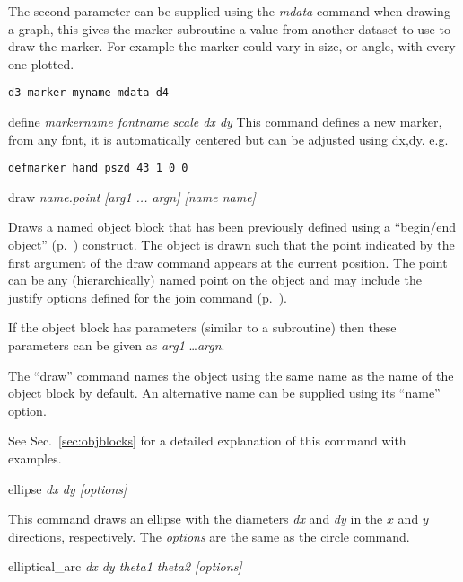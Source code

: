 \begin{commanddescription}
The second parameter can be supplied using the {\it mdata} command
when drawing a graph,  this gives the marker subroutine a
value from another dataset to use to draw the marker.  For
example the marker could vary in size, or angle, with every
one plotted.

\begin{Verbatim}
d3 marker myname mdata d4
\end{Verbatim}

\item[{\sf define {\it markername  fontname scale dx dy}}]
This command defines a new marker, from any font, it is
automatically centered but can be adjusted using dx,dy. e.g.

\begin{Verbatim}
defmarker hand pszd 43 1 0 0
\end{Verbatim}

\item[{\sf draw {\it name.point [{\it arg1} ... {\it argn}] [name {\it name}]}}]
\label{cmd:draw}

Draws a named object block that has been previously defined using a ``begin/end object'' (p.~\pageref{cmd:beginobject}) construct. The object is drawn such that the point indicated by the first argument of the draw command appears at the current position. The point can be any (hierarchically) named point on the object and may include the justify options defined for the join command (p.~\pageref{cmd:join}).

If the object block has parameters (similar to a subroutine) then these parameters can be given as {\it arg1} \ldots {\it argn}.

The ``draw'' command names the object using the same name as the name of the object block by default. An alternative name can be supplied using its ``name'' option.

See Sec.~\ref{sec:objblocks} for a detailed explanation of this command with examples.

\item[{\sf ellipse} {\it dx dy [options]}]

This command draws an ellipse with the diameters {\it dx} and {\it dy} in the $x$ and $y$ directions, respectively.  The {\it options} are the same as the {\sf circle} command.

\item[{\sf elliptical\_arc} {\it dx dy theta1 theta2 [options]}]


\end{commanddescription}
